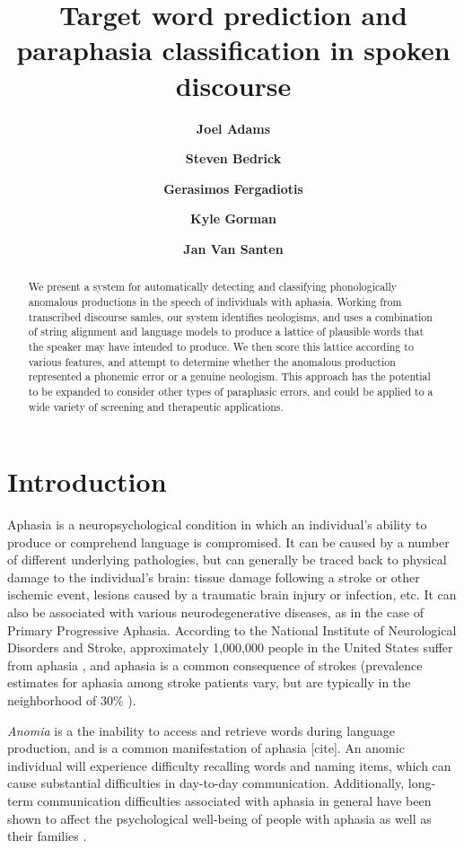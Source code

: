 \documentclass[11pt,letterpaper]{article}
\title{Target word prediction and paraphasia classification in spoken discourse}
\author[1]{\textbf{Joel Adams}}
\author[1]{\textbf{Steven Bedrick}}
\author[2]{\textbf{Gerasimos Fergadiotis}}
\author[3]{\textbf{Kyle Gorman}}
\author[1]{\textbf{Jan Van Santen}}
\affil[1]{Center for Spoken Language Understanding, Oregon Health \& Science University, Portland, OR}
\affil[2]{Speech \& Hearing Sciences Department, Portland State University, Portland, OR}
\affil[3]{Google, Inc., New York, NY}
\date{}
\begin{document}
\maketitle

\begin{abstract}

We present a system for automatically detecting and classifying phonologically anomalous productions in the speech of individuals with aphasia. 
Working from transcribed discourse samles, our system identifies neologisms, and uses a combination of string alignment and language models to produce a lattice of plausible words that the speaker may have intended to produce. 
We then score this lattice according to various features, and attempt to determine whether the anomalous production represented a phonemic error or a genuine neologism. 
This approach has the potential to be expanded to consider other types of paraphasic errors, and could be applied to a wide variety of screening and therapeutic applications.

\end{abstract}

\section{Introduction}

Aphasia is a neuropsychological condition in which an individual's ability to produce or comprehend language is compromised. 
It can be caused by a number of different underlying pathologies, but can generally be traced back to physical damage to the individual's brain: tissue damage following a stroke or other ischemic event, lesions caused by a traumatic brain injury or infection, etc. 
It can also be associated with various neurodegenerative diseases, as in the case of Primary Progressive Aphasia. 
According to the National Institute of Neurological Disorders and Stroke, approximately 1,000,000 people in the United States suffer from aphasia \cite{National-Institute-of-Neurological-Disorders-and-Stroke:2014la}, and aphasia is a common consequence of strokes (prevalence estimates for aphasia among stroke patients vary, but are typically in the neighborhood of 30\% \cite{Engelter:2006da}).

\emph{Anomia} is a the inability to access and retrieve words during language production, and is a common manifestation of aphasia [cite].
An anomic individual will experience difficulty recalling words and naming items, which can cause substantial difficulties in day-to-day communication. 
Additionally, long-term communication difficulties associated with aphasia in general have been shown to affect the psychological well-being of people with aphasia as well as their families \cite{doi:10.1080/02687030244000707,Gaete:2008jr,vanDijk:2015gz}.
\end{document}
